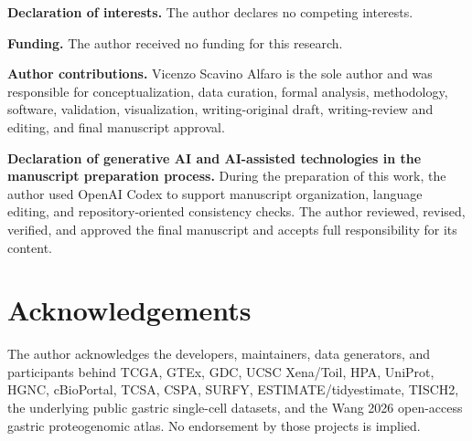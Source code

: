 \documentclass[preprint,12pt,authoryear]{elsarticle}
\begin{document}
\textbf{Declaration of interests.} The author declares no competing interests.

\textbf{Funding.} The author received no funding for this research.

\textbf{Author contributions.} Vicenzo Scavino Alfaro is the sole author and was responsible for conceptualization, data curation, formal analysis, methodology, software, validation, visualization, writing-original draft, writing-review and editing, and final manuscript approval.

\textbf{Declaration of generative AI and AI-assisted technologies in the manuscript preparation process.} During the preparation of this work, the author used OpenAI Codex to support manuscript organization, language editing, and repository-oriented consistency checks. The author reviewed, revised, verified, and approved the final manuscript and accepts full responsibility for its content.

\FloatBarrier
\section{Acknowledgements}

The author acknowledges the developers, maintainers, data generators, and participants behind TCGA, GTEx, GDC, UCSC Xena/\allowbreak{}Toil, HPA, UniProt, HGNC, cBioPortal, TCSA, CSPA, SURFY, ESTIMATE/\allowbreak{}tidyestimate, TISCH2, the underlying public gastric single-cell datasets, and the Wang 2026 open-access gastric proteogenomic atlas. No endorsement by those projects is implied.


\end{document}
